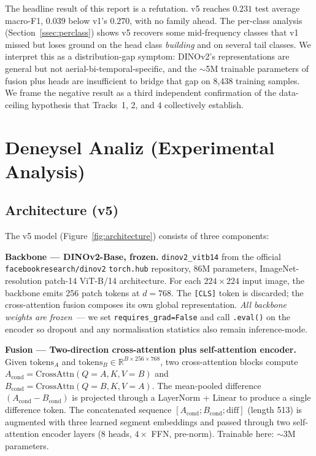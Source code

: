 \documentclass[journal]{IEEEtran}
\begin{document}
The headline result of this report is a refutation. v5 reaches $0.231$ test average macro-F1, $0.039$ below v1's $0.270$, with no family ahead. The per-class analysis (Section~\ref{ssec:perclass}) shows v5 recovers some mid-frequency classes that v1 missed but loses ground on the head class \emph{building} and on several tail classes. We interpret this as a distribution-gap symptom: DINOv2's representations are general but not aerial-bi-temporal-specific, and the $\sim$5M trainable parameters of fusion plus heads are insufficient to bridge that gap on 8{,}438 training samples. We frame the negative result as a third independent confirmation of the data-ceiling hypothesis that Tracks~1, 2, and 4 collectively establish.

\section{Deneysel Analiz (Experimental Analysis)}\label{sec:deneyselanaliz}

\subsection{Architecture (v5)}\label{ssec:arch}

The v5 model (Figure~\ref{fig:architecture}) consists of three components:

\textbf{Backbone --- DINOv2-Base, frozen.} \texttt{dinov2\_vitb14} from the official \texttt{facebookresearch/dinov2} \texttt{torch.hub} repository, 86M parameters, ImageNet-resolution patch-14 ViT-B/14 architecture. For each $224{\times}224$ input image, the backbone emits 256 patch tokens at $d{=}768$. The \texttt{[CLS]} token is discarded; the cross-attention fusion composes its own global representation. \emph{All backbone weights are frozen}~--- we set \texttt{requires\_grad{=}False} and call \texttt{.eval()} on the encoder so dropout and any normalisation statistics also remain inference-mode.

\textbf{Fusion --- Two-direction cross-attention plus self-attention encoder.} Given $\mathrm{tokens}_A$ and $\mathrm{tokens}_B \in \mathbb{R}^{B \times 256 \times 768}$, two cross-attention blocks compute $A_\mathrm{cond} = \mathrm{CrossAttn}(Q{=}A, K,V{=}B)$ and $B_\mathrm{cond} = \mathrm{CrossAttn}(Q{=}B, K,V{=}A)$. The mean-pooled difference $(A_\mathrm{cond} - B_\mathrm{cond})$ is projected through a LayerNorm + Linear to produce a single difference token. The concatenated sequence $[A_\mathrm{cond}; B_\mathrm{cond}; \mathrm{diff}]$ (length 513) is augmented with three learned segment embeddings and passed through two self-attention encoder layers (8 heads, $4{\times}$ FFN, pre-norm). Trainable here: $\sim$3M parameters.
\end{document}
